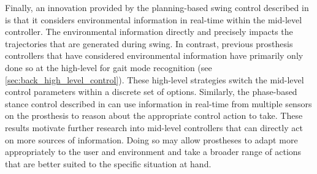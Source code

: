 Finally, an innovation provided by the planning-based swing control described in
is that it considers environmental information in real-time within the mid-level
controller. The environmental information directly and precisely impacts the
trajectories that are generated during swing. In contrast, previous prosthesis
controllers that have considered environmental information have primarily only
done so at the high-level for gait mode recognition (see
\cref{sec:back_high_level_control}). These high-level strategies switch the
mid-level control parameters within a discrete set of options. Similarly, the
phase-based stance control described in
can use information in real-time from multiple sensors on the prosthesis to
reason about the appropriate control action to take. These results motivate
further research into mid-level controllers that can directly act on more
sources of information. Doing so may allow prostheses to adapt more
appropriately to the user and environment and take a broader range of actions
that are better suited to the specific situation at hand. 
